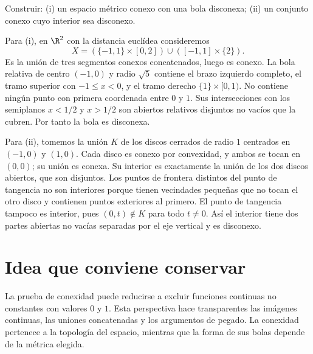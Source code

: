 \begin{ejercicio}
Construir: (i) un espacio métrico conexo con una bola disconexa; (ii) un conjunto conexo cuyo interior sea disconexo.
\end{ejercicio}
\begin{solucion}
Para (i), en $\R^2$ con la distancia euclídea consideremos
\[
X=(\{-1,1\}\times[0,2])\cup([-1,1]\times\{2\}).
\]
Es la unión de tres segmentos conexos concatenados, luego es conexo. La bola relativa de centro $(-1,0)$ y radio $\sqrt5$ contiene el brazo izquierdo completo, el tramo superior con $-1\le x<0$, y el tramo derecho $\{1\}\times[0,1)$. No contiene ningún punto con primera coordenada entre $0$ y $1$. Sus intersecciones con los semiplanos $x<1/2$ y $x>1/2$ son abiertos relativos disjuntos no vacíos que la cubren. Por tanto la bola es disconexa.

Para (ii), tomemos la unión $K$ de los discos cerrados de radio $1$ centrados en $(-1,0)$ y $(1,0)$. Cada disco es conexo por convexidad, y ambos se tocan en $(0,0)$; su unión es conexa. Su interior es exactamente la unión de los dos discos abiertos, que son disjuntos. Los puntos de frontera distintos del punto de tangencia no son interiores porque tienen vecindades pequeñas que no tocan el otro disco y contienen puntos exteriores al primero. El punto de tangencia tampoco es interior, pues $(0,t)\notin K$ para todo $t\ne0$. Así el interior tiene dos partes abiertas no vacías separadas por el eje vertical y es disconexo.
\end{solucion}

\section{Idea que conviene conservar}
La prueba de conexidad puede reducirse a excluir funciones continuas no constantes con valores $0$ y $1$. Esta perspectiva hace transparentes las imágenes continuas, las uniones concatenadas y los argumentos de pegado. La conexidad pertenece a la topología del espacio, mientras que la forma de sus bolas depende de la métrica elegida.
